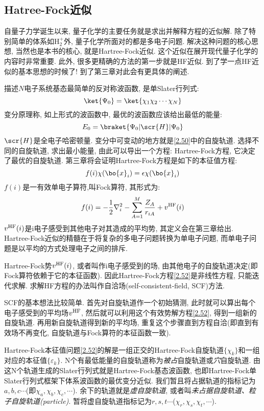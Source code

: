 \subsection{Hatree-Fock近似}
 \label{sec2.2.4}
自量子力学诞生以来, 
量子化学的主要任务就是求出并解释\sch 方程的近似解. 
除了特别简单的体系如$\text{H}^+_2$外, 
量子化学所面对的都是多电子问题. 
解决这种问题的核心思想, 
当然也是本书的核心, 
就是Hartree-Fock近似. 
这个近似在展开现代量子化学的内容时非常重要. 
此外, 
很多更精确的方法的第一步就是HF近似. 
到了学一点HF近似的基本思想的时候了! 到了第三章对此会有更具体的阐述.


描述$N$电子系统基态最简单的反对称波函数, 
是单Slater行列式:
\begin{equation}
\label{2.50}
\ket{\Psi_0}=\ket{\chi_1\chi_2\cdots\chi_N}
\end{equation}
变分原理称, 
如上形式的波函数中, 
最优的波函数应该给出最低的能量:
\begin{equation}
E_0=\braket{\Psi_0|\scr{H}|\Psi_0}
\end{equation}
$\scr{H}$是全电子哈密顿量. 
变分中可变动的地方就是\autoref{2.50}中的自旋轨道. 
选择不同的自旋轨道, 
求出最小能量, 
由此可以导出一个方程: Hartree-Fock方程, 
它决定了最优的自旋轨道. 
第三章将会证明Hartree-Fock方程是如下的本征值方程:
\begin{equation}
f(i)\chi(\bo{x}_i)=\epsilon\chi(\bo{x}_i)
\label{2.52}
\end{equation}
$f(i)$是一有效单电子算符,叫Fock算符, 其形式为:
\begin{equation}
\label{2.53}
f(i)=-\frac{1}{2}\nabla_i^2 - \sum_{A=1}^M\frac{Z_A}{r_{iA}} + v^{\rm HF}(i)
\end{equation}
$v^{\rm HF}(i)$是i电子感受到其他电子对其造成的平均势, 其定义会在第三章给出. Hartree-Fock近似的精髓在于将复杂的多电子问题转换为单电子问题, 而单电子问题是以平均的方式处理电子之间的排斥.

Hartree-Fock势$v^{\rm HF}(i)$, 或者叫作i电子感受到的场, 由其他电子的自旋轨道决定(即Fock算符依赖于它的本征函数).  因此Hartree-Fock方程\autoref{2.52}是非线性方程, 只能迭代求解. 求解HF方程的办法叫作自洽场(self-consistent-field, SCF)方法.

SCF的基本想法比较简单. 首先对自旋轨道作一个初始猜测, 此时就可以算出每个电子感受到的平均场$v^{\rm HF}$, 然后就可以利用这个有效势解方程\autoref{2.52}, 得到一组新的自旋轨道. 再用新自旋轨道得到新的平均场, 重复这个步骤直到方程自洽(即直到有效场不再变化, 自旋轨道与Fock算符的本征函数一致).

Hartree-Fock本征值问题\autoref{2.52}的解是一组正交的Hartree-Fock自旋轨道$\{\chi_k\}$和一组对应的本征值$\{\varepsilon_k\}$. N个有最低能量的自旋轨道称为\emph{被占}自旋轨道或\emph{穴}自旋轨道. 由这N个轨道生成的Slater行列式就是Hartree-Fock基态波函数, 也即Hartree-Fock单Slater行列式框架下体系波函数的最优变分近似. 我们暂且将占据轨道的指标记为$a,b,c\cdots$(即$\chi_a,\chi_b,\chi_c,\cdots$). 余下的轨道就是\emph{虚自旋轨道}, 或者叫\emph{未占据自旋轨道、粒子自旋轨道(particle)}. 暂将虚自旋轨道指标记为$r,s,t\cdots$($\chi_r,\chi_s,\chi_t,\cdots$).

